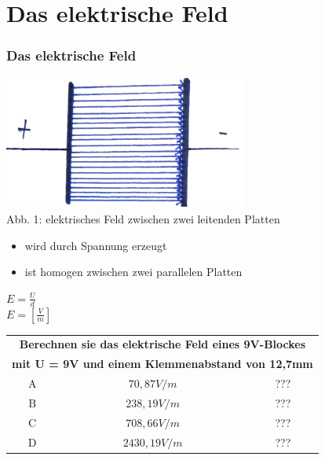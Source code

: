 

\subtitle{Technik Klasse E 08: \\
          Elektromagnetisches Feld \\[2em]}
\date{Stand 26.11.2014}



\section*{Das elektrische Feld}
\begin{frame}
\frametitle{Das elektrische Feld}
	\begin{center}
		\includegraphics[width=0.6\textwidth]{e08/efeld1.png}\\
		Abb. 1: elektrisches Feld zwischen zwei leitenden Platten
		\begin{itemize}
			\item wird durch Spannung erzeugt
			\item ist homogen zwischen zwei parallelen Platten
		\end{itemize}
	\end{center}
\end{frame}

\begin{frame}
	\begin{center}
		\huge$E = \frac{U}{d}$\\
		\vspace{0.5cm}		
		\huge$E = [\frac{V}{m}]$\\
		\vspace{0.5cm}
		\begin{small}
		\begin{tabular}{|c|c|c|}
		\hline
		\multicolumn{3}{|c|}{\textbf{Berechnen sie das elektrische Feld eines 9V-Blockes}}\\
		\multicolumn{3}{|c|}{\textbf{mit U = 9V und einem Klemmenabstand von 12,7mm}}\\
		\hline
		A & $ 70,87 V/m $    & ??? \\ \hline
		B & $ 238,19 V/m $   & ??? \\ \hline
		C & $ 708,66 V/m $   & ??? \\ \hline
		D & $ 2430,19 V/m $  & ??? \\ \hline
	\end{tabular}
	\end{small}		
	\end{center}
\end{frame}


